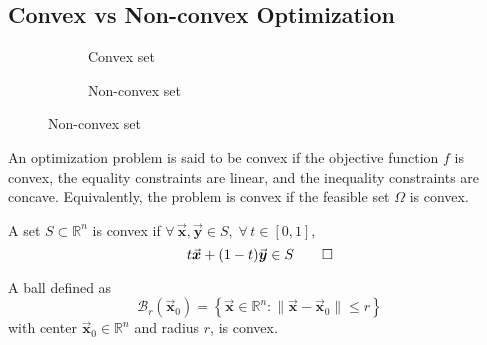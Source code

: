 \documentclass[9pt, headings=standardclasses, parskip=half]{scrartcl}
\renewcommand{\emph}[1]{\textcolor{mypurple}{#1}}
\newcommand{\vect}[1]{\vec{\boldsymbol{#1}}}
\begin{document}
\subsection{Convex vs Non-convex Optimization}

\begin{figure}[h]
\centering
\begin{subfigure}{0.2\textwidth}
    \centering
    \caption*{Convex set}
\end{subfigure}
\begin{subfigure}{0.2\textwidth}
    \centering
    \caption*{Non-convex set}
\end{subfigure}
\label{fig:convexSet}
\end{figure}


An optimization problem is said to be \emph{convex} if the objective function \(f\) is convex, the equality constraints are linear, and the inequality constraints are concave. Equivalently, the problem is convex if the feasible set \(\Omega\) is convex.

\begin{definition}\label{def:convex_set}
A set \(S\subset\mathbb{R}^{n}\) is \emph{convex} if \(\forall\,\vect{x},\vect{y}\in S,\; \forall\, t\in[0,1]\),
\[
t\vect{x}+(1-t)\vect{y}\in S
\qedhere
\]
\end{definition}

\begin{example}
A ball defined as
\[
\mathcal{B}_{r}(\vect{x}_{0})=\left\{ \vect{x}\in\mathbb{R}^{n} : \|\vect{x}-\vect{x}_{0}\|\leq r \right\}
\]
with center \(\vect{x}_{0}\in\mathbb{R}^{n}\) and radius \(r\), is convex.
\end{example}
\end{document}
